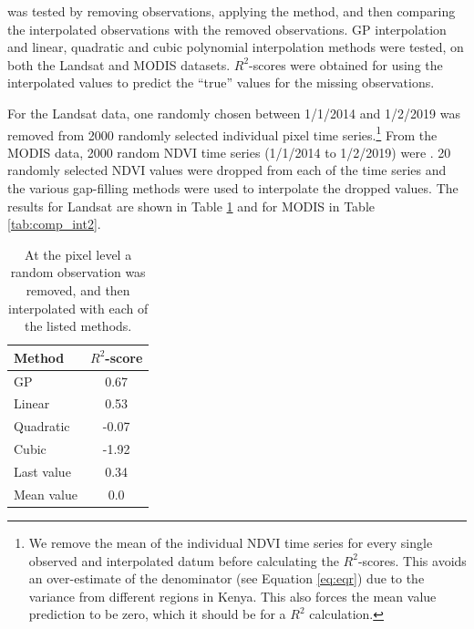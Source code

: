 \documentclass[review]{elsarticle}
\begin{document}
 was tested by removing observations, applying the method, and then comparing the interpolated observations with the removed observations. GP interpolation and linear, quadratic and cubic polynomial interpolation methods were tested, on both the Landsat and MODIS datasets. $R^2$-scores were obtained for using the interpolated values to predict the ``true'' values for the missing observations.


For the Landsat data, one randomly chosen  between 1/1/2014 and 1/2/2019 was removed from  2000 randomly selected individual pixel time series.\footnote{We remove the mean of the individual NDVI time series for every single observed and interpolated datum before calculating the $R^2$-scores. This avoids an over-estimate of the denominator (see Equation \ref{eq:eqr}) due to the variance from different regions in Kenya. This also forces the mean value prediction to be zero, which it should be for a $R^2$ calculation.} 
From the MODIS data, 2000 random  NDVI time series (1/1/2014 to 1/2/2019) were . 20 randomly selected NDVI values were dropped from each of the time series and the various gap-filling methods were used to interpolate the dropped values. The results for Landsat are shown in Table \ref{tab:comp_int} and for MODIS in Table \ref{tab:comp_int2}.



\begin{table}
	\caption{ At the pixel level a random observation was removed, and then interpolated with each of the listed methods.} \label{tab:comp_int}
	\centering
	\begin{tabular}{lc} 
		\toprule
		\textbf{Method}  & \textbf{$R^2$-score} \\
		\midrule
		GP & 0.67 \\
		Linear & 0.53 \\
		Quadratic & -0.07 \\
		Cubic & -1.92 \\
		Last value & 0.34 \\
		Mean value & 0.0 \\
		\bottomrule
	\end{tabular}
\end{table}
\end{document}
